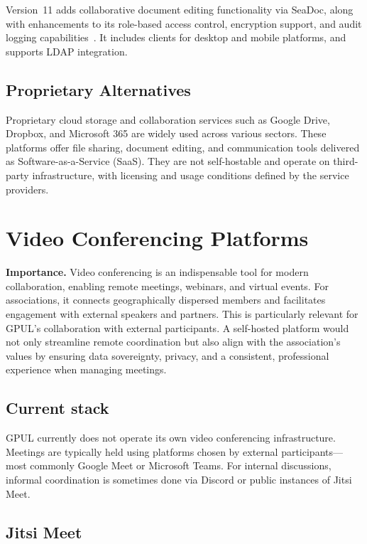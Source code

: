 Version~11 adds collaborative document editing functionality via SeaDoc, along with enhancements to its role-based access control, encryption support, and audit logging capabilities~\cite{seafile-forum}. It includes clients for desktop and mobile platforms, and supports LDAP integration.

\subsection*{Proprietary Alternatives}

Proprietary cloud storage and collaboration services such as Google Drive, Dropbox, and Microsoft 365 are widely used across various sectors. These platforms offer file sharing, document editing, and communication tools delivered as Software-as-a-Service (SaaS). They are not self-hostable and operate on third-party infrastructure, with licensing and usage conditions defined by the service providers.

\section{Video Conferencing Platforms}

\textbf{Importance.} Video conferencing is an indispensable tool for modern collaboration, enabling remote meetings, webinars, and virtual events. For associations, it connects geographically dispersed members and facilitates engagement with external speakers and partners. This is particularly relevant for GPUL's collaboration with external participants. A self-hosted platform would not only streamline remote coordination but also align with the association's values by ensuring data sovereignty, privacy, and a consistent, professional experience when managing meetings.

\subsection*{Current stack}

GPUL currently does not operate its own video conferencing infrastructure. Meetings are typically held using platforms chosen by external participants—most commonly Google Meet or Microsoft Teams. For internal discussions, informal coordination is sometimes done via Discord or public instances of Jitsi Meet.

\subsection*{Jitsi Meet}


